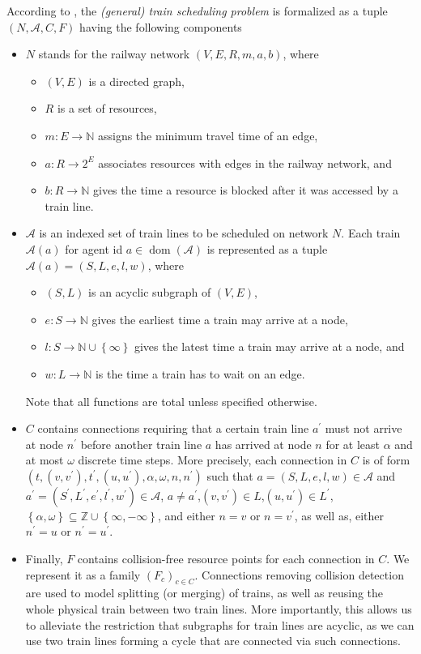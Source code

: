 \documentclass{article}
\DeclareMathOperator{\dom}{dom}
\begin{document}
According to \cite{DBLP:journals/corr/abs-2003-08598},  the \emph{(general) train scheduling problem} is formalized as a tuple $(N, \mathcal{A}, C, F)$ having the following components
\begin{itemize}
    \item $N$ stands for the railway network $(V, E, R, m, a, b)$, where
        \begin{itemize}
            \item $(V, E)$ is a directed graph,
            \item $R$ is a set of resources,
            \item $m:E\to\mathbb{N}$ assigns the minimum travel time of an edge,
            \item $a: R\to 2^E$ associates resources with edges in the railway network, and
            \item $b:R\to \mathbb{N}$ gives the time a resource is blocked after it was accessed by a train line.
        \end{itemize}
    \item $\mathcal{A}$ is an indexed set of train lines to be scheduled on network $N$. Each train $\mathcal{A}(a)$ for agent id $a\in \dom(\mathcal{A})$ is represented as a tuple $\mathcal{A}(a)=(S, L, e, l, w)$, where
        \begin{itemize}
            \item $(S, L)$ is an acyclic subgraph of $(V, E)$,
            \item $e:S \to \mathbb{N}$ gives the earliest time a train may arrive at a node,
            \item $l:S\to \mathbb{N} \cup \left\{\infty\right\}$ gives the latest time a train may arrive at a node, and
            \item $w:L\to \mathbb{N}$ is the time a train has to wait on an edge.
        \end{itemize}
        Note that all functions are total unless specified otherwise.
        \item $C$ contains connections requiring that a certain train line $a^\prime$ must not arrive at node $n^\prime$ before another train line $a $ has arrived at node $n$ for at least $\alpha$ and at most $\omega$ discrete time steps. More precisely, each connection in $C$ is of form $(t,(v, v^\prime), t^\prime,(u, u^\prime), \alpha, \omega, n, n^\prime)$ such that $a= (S, L, e, l, w)\in \mathcal{A}$ and $a^\prime= (S^\prime, L^\prime, e^\prime, l^\prime, w^\prime)\in \mathcal{A}$, $a\not=a^\prime$,$(v, v^\prime)\in L$,$(u, u^\prime)\in L^\prime$,$\left\{\alpha,\omega\right\} \subseteq \mathbb{Z} \cup \left\{\infty,-\infty\right\}$, and either $n=v$ or $n=v^\prime$, as well as, either $n^\prime=u$ or $n^\prime=u^\prime$.
    \item Finally, $F$ contains collision-free resource points for each connection in $C$. We represent it as a family $(F_c)_{c\in C}$. Connections removing collision detection are used to model splitting (or merging) of trains, as well as reusing the whole physical train between two train lines. More importantly, this allows us to alleviate the restriction that subgraphs for train lines are acyclic, as we can use two train lines forming a cycle that are connected via such connections.
\end{itemize}
\end{document}
